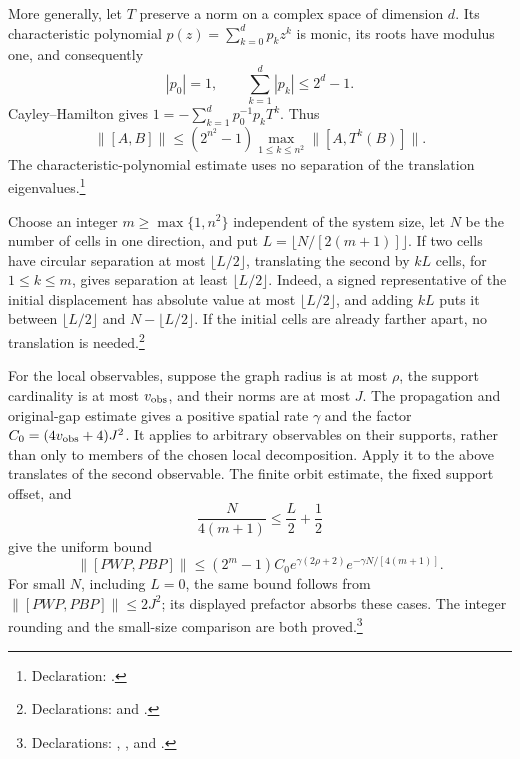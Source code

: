 \documentclass{article}
\begin{document}
More generally, let $T$ preserve a norm on a complex space of dimension
$d$. Its characteristic polynomial $p(z)=\sum_{k=0}^d p_kz^k$ is monic,
its roots have modulus one, and consequently
\[
 |p_0|=1,\qquad \sum_{k=1}^d|p_k|\le2^d-1.
\]
Cayley--Hamilton gives $1=-\sum_{k=1}^d p_0^{-1}p_kT^k$. Thus
\[
 \|[A,B]\|\le(2^{n^2}-1)
       \max_{1\le k\le n^2}\|[A,T^k(B)]\|.
\]
The characteristic-polynomial estimate uses no separation of the
translation eigenvalues.\footnote{Declaration:
.}

Choose an integer $m\ge\max\{1,n^2\}$ independent of the system size,
let $N$ be the number of cells in one direction, and put
$L=\lfloor N/[2(m+1)]\rfloor$. If two cells have circular separation at
most $\lfloor L/2\rfloor$, translating the second by $kL$ cells, for
$1\le k\le m$, gives separation at least $\lfloor L/2\rfloor$.
Indeed, a signed representative of the initial displacement has absolute
value at most $\lfloor L/2\rfloor$, and adding $kL$ puts it between
$\lfloor L/2\rfloor$ and $N-\lfloor L/2\rfloor$. If the initial cells
are already farther apart, no translation is needed.\footnote{Declarations:
 and
.}

For the local observables, suppose the graph radius is at most $\rho$,
the support cardinality is at most $v_{\rm obs}$, and their norms are at
most $J$. The propagation and original-gap estimate gives a positive
spatial rate $\gamma$ and the factor
$C_0=(4v_{\rm obs}+4)J^2$. It applies to arbitrary observables on their
supports, rather than only to members of the chosen local decomposition.
Apply it to the above translates of the second observable. The finite
orbit estimate, the fixed support offset, and
\[
 \frac{N}{4(m+1)}\le\frac{L}{2}+\frac12
\]
give the uniform bound
\[
 \|[PWP,PBP]\|\le
 (2^m-1)C_0 e^{\gamma(2\rho+2)}
       e^{-\gamma N/[4(m+1)]}.
\]
For small $N$, including $L=0$, the same bound follows from
$\|[PWP,PBP]\|\le2J^2$; its displayed prefactor absorbs these cases.
The integer rounding and the small-size comparison are both
proved.\footnote{Declarations:
,
, and
.}
\end{document}
